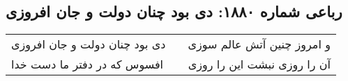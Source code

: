 \begin{center}
\section*{رباعی شماره ۱۸۸۰: دی بود چنان دولت و جان افروزی}
\label{sec:1880}
\begin{longtable}{l p{0.5cm} r}
دی بود چنان دولت و جان افروزی
&&
و امروز چنین آتش عالم سوزی
\\
افسوس که در دفتر ما دست خدا
&&
آن را روزی نبشت این را روزی
\\
\end{longtable}
\end{center}
